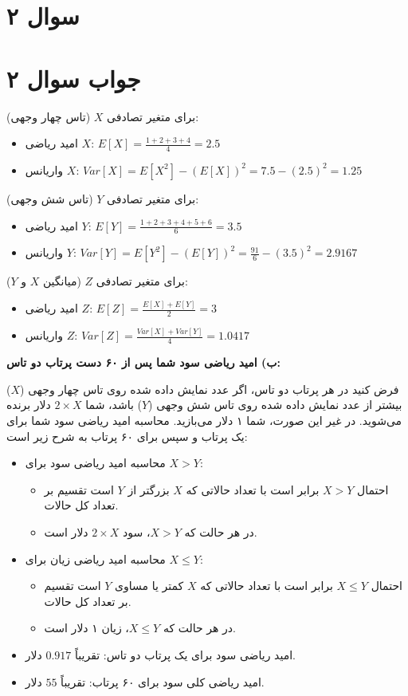\section*{سوال ۲}



\section*{جواب سوال ۲}

برای متغیر تصادفی \(X\) (تاس چهار وجهی):
\begin{itemize}
	\item امید ریاضی \(X\): \(E[X] = \frac{1 + 2 + 3 + 4}{4} = 2.5\)
	\item واریانس \(X\): \(Var[X] = E[X^2] - (E[X])^2 = 7.5 - (2.5)^2 = 1.25\)
\end{itemize}

برای متغیر تصادفی \(Y\) (تاس شش وجهی):
\begin{itemize}
	\item امید ریاضی \(Y\): \(E[Y] = \frac{1 + 2 + 3 + 4 + 5 + 6}{6} = 3.5\)
	\item واریانس \(Y\): \(Var[Y] = E[Y^2] - (E[Y])^2 = \frac{91}{6} - (3.5)^2 = 2.9167\)
\end{itemize}

برای متغیر تصادفی \(Z\) (میانگین \(X\) و \(Y\)):
\begin{itemize}
	\item امید ریاضی \(Z\): \(E[Z] = \frac{E[X] + E[Y]}{2} = 3\)
	\item واریانس \(Z\): \(Var[Z] = \frac{Var[X] + Var[Y]}{4} = 1.0417\)
\end{itemize}

\textbf{ب) امید ریاضی سود شما پس از ۶۰ دست پرتاب دو تاس:}

فرض کنید در هر پرتاب دو تاس، اگر عدد نمایش داده شده روی تاس چهار وجهی (\(X\)) بیشتر از عدد نمایش داده شده روی تاس شش وجهی (\(Y\)) باشد، شما \(2 \times X\) دلار برنده می‌شوید. در غیر این صورت، شما ۱ دلار می‌بازید. محاسبه امید ریاضی سود شما برای یک پرتاب و سپس برای ۶۰ پرتاب به شرح زیر است:

\begin{itemize}
	\item محاسبه امید ریاضی سود برای \(X > Y\):
	\begin{itemize}
		\item احتمال \(X > Y\) برابر است با تعداد حالاتی که \(X\) بزرگتر از \(Y\) است تقسیم بر تعداد کل حالات.
		\item در هر حالت که \(X > Y\)، سود \(2 \times X\) دلار است.
	\end{itemize}
	\item محاسبه امید ریاضی زیان برای \(X \leq Y\):
	\begin{itemize}
		\item احتمال \(X \leq Y\) برابر است با تعداد حالاتی که \(X\) کمتر یا مساوی \(Y\) است تقسیم بر تعداد کل حالات.
		\item در هر حالت که \(X \leq Y\)، زیان ۱ دلار است.
	\end{itemize}
	\item امید ریاضی سود برای یک پرتاب دو تاس: تقریباً \(0.917\) دلار.
	\item امید ریاضی کلی سود برای ۶۰ پرتاب: تقریباً \(55\) دلار.
\end{itemize}
